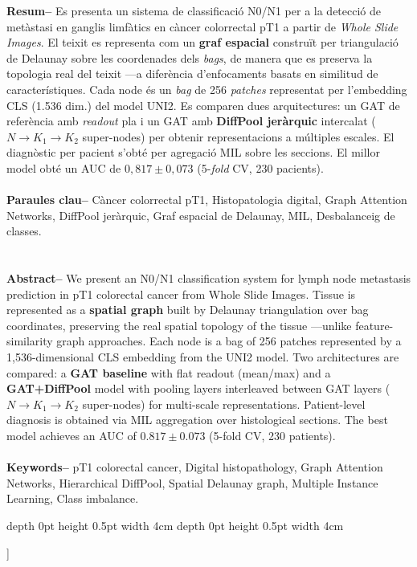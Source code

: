 \documentclass[10pt,a4paper,twocolumn,twoside]{article}
\begin{document}
\begin{@twocolumnfalse}
\begin{center}
\parbox{0.915\textwidth}
{\sffamily
\textbf{Resum--}
Es presenta un sistema de classificació N0/N1 per a la detecció de metàstasi en ganglis limfàtics
en càncer colorrectal pT1 a partir de \textit{Whole Slide Images}. El teixit es representa com un
\textbf{graf espacial} construït per triangulació de Delaunay sobre les coordenades dels \textit{bags},
de manera que es preserva la topologia real del teixit —a diferència d'enfocaments basats en similitud de
característiques. Cada node és un \textit{bag} de 256 \textit{patches} representat per l'embedding
CLS (1.536 dim.) del model UNI2. Es comparen dues arquitectures: un GAT de referència
amb \textit{readout} pla i un GAT amb \textbf{DiffPool jeràrquic} intercalat ($N\!\to\!K_1\!\to\!K_2$
super-nodes) per obtenir representacions a múltiples escales. El diagnòstic per pacient s'obté per
agregació MIL sobre les seccions. El millor model obté un AUC de $0{,}817 \pm 0{,}073$ (5-\textit{fold} CV, 230 pacients).
\\
\\
\textbf{Paraules clau-- } Càncer colorrectal pT1, Histopatologia digital, Graph Attention Networks,
DiffPool jeràrquic, Graf espacial de Delaunay, MIL, Desbalanceig de classes.\\
\\
\bigskip
\\
\textbf{Abstract--}
We present an N0/N1 classification system for lymph node metastasis prediction in pT1 colorectal
cancer from Whole Slide Images. Tissue is represented as a \textbf{spatial graph} built by Delaunay
triangulation over bag coordinates, preserving the real spatial topology of the tissue —unlike
feature-similarity graph approaches. Each node is a bag of 256 patches represented by a
1,536-dimensional CLS embedding from the UNI2 model. Two architectures are compared: a
\textbf{GAT baseline} with flat readout (mean/max) and a \textbf{GAT+DiffPool} model
with pooling layers interleaved between GAT layers ($N\!\to\!K_1\!\to\!K_2$ super-nodes) for
multi-scale representations. Patient-level diagnosis is obtained via MIL aggregation over
histological sections. The best model achieves an AUC of $0.817 \pm 0.073$ (5-fold CV, 230 patients).
\\
\\
\textbf{Keywords-- } pT1 colorectal cancer, Digital histopathology, Graph Attention Networks,
Hierarchical DiffPool, Spatial Delaunay graph, Multiple Instance Learning, Class imbalance.\\
}

\bigskip

{\vrule depth 0pt height 0.5pt width 4cm\hspace{7.5pt}%
%
\hspace{7.5pt}\vrule depth 0pt height 0.5pt width 4cm\relax}

\end{center}

\bigskip
\end{@twocolumnfalse}]
\end{document}
